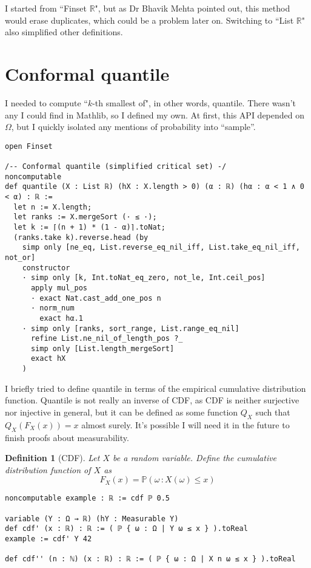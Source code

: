 \documentclass[a4paper, 12pt]{article}
\newtheorem{definition}{Definition}
\newcommand{\R}{\mathbb{R}}
\renewcommand{\P}{\mathbb{P}}
\begin{document}
I started from ``Finset $\R$",
but as Dr Bhavik Mehta pointed out,
this method would erase duplicates,
which could be a problem later on.
Switching to ``List $\R$" also simplified
other definitions.

\section*{Conformal quantile}

I needed to compute ``$k$-th smallest of", in other words, quantile.
There wasn't any I could find in Mathlib, so I defined my own.
At first, this API depended on $\Omega$,
but I quickly isolated any mentions of probability into ``sample''.

\begin{lstlisting}
open Finset

/-- Conformal quantile (simplified critical set) -/
noncomputable
def quantile (X : List ℝ) (hX : X.length > 0) (α : ℝ) (hα : α < 1 ∧ 0 < α) : ℝ :=
  let n := X.length;
  let ranks := X.mergeSort (· ≤ ·);
  let k := ⌈(n + 1) * (1 - α)⌉.toNat;
  (ranks.take k).reverse.head (by
    simp only [ne_eq, List.reverse_eq_nil_iff, List.take_eq_nil_iff, not_or]
    constructor
    · simp only [k, Int.toNat_eq_zero, not_le, Int.ceil_pos]
      apply mul_pos
      · exact Nat.cast_add_one_pos n
      · norm_num
        exact hα.1
    · simp only [ranks, sort_range, List.range_eq_nil]
      refine List.ne_nil_of_length_pos ?_
      simp only [List.length_mergeSort]
      exact hX
    )
\end{lstlisting}

I briefly tried to define quantile in terms of the empirical cumulative distribution function.
Quantile is not really an inverse of CDF, as CDF is neither surjective nor injective in general,
but it can be defined as some function $Q_X$ such that $Q_X(F_X(x))=x$ almost surely.
It's possible I will need it in the future to finish proofs about measurability.

\begin{definition}[CDF]
Let $X$ be a random variable.
Define the cumulative distribution function of $X$ as $$F_X(x)=\P(\omega\,\colon X(\omega)\le x)$$
\end{definition}

\begin{lstlisting}
noncomputable example : ℝ := cdf ℙ 0.5

variable (Y : Ω → ℝ) (hY : Measurable Y)
def cdf' (x : ℝ) : ℝ := ( ℙ { ω : Ω | Y ω ≤ x } ).toReal
example := cdf' Y 42

def cdf'' (n : ℕ) (x : ℝ) : ℝ := ( ℙ { ω : Ω | X n ω ≤ x } ).toReal
\end{lstlisting}
\end{document}
